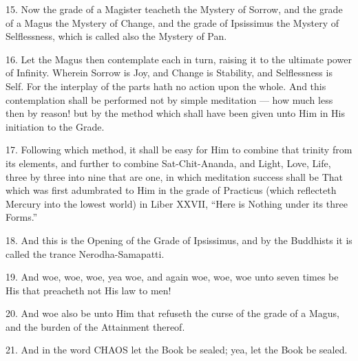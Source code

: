 15. Now the grade of a Magister teacheth the Mystery of Sorrow, and the grade of a Magus the Mystery of Change, and the grade of Ipsissimus the Mystery of Selflessness, which is called also the Mystery of Pan.

16. Let the Magus then contemplate each in turn, raising it to the ultimate power of Infinity. Wherein Sorrow is Joy, and Change is Stability, and Selflessness is Self. For the interplay of the parts hath no action upon the whole. And this contemplation shall be performed not by simple meditation --- how much less then by reason! but by the method which shall have been given unto Him in His initiation to the Grade.

17. Following which method, it shall be easy for Him to combine that trinity from its elements, and further to combine Sat-Chit-Ananda, and Light, Love, Life, three by three into nine that are one, in which meditation success shall be That which was first adumbrated to Him in the grade of Practicus (which reflecteth Mercury into the lowest world) in Liber XXVII, \enquote{Here is Nothing under its three Forms.}

18. And this is the Opening of the Grade of Ipsissimus, and by the Buddhists it is called the trance Nerodha-Samapatti.

19. And woe, woe, woe, yea woe, and again woe, woe, woe unto seven times be His that preacheth not His law to men!

20. And woe also be unto Him that refuseth the curse of the grade of a Magus, and the burden of the Attainment thereof.

21. And in the word CHAOS let the Book be sealed; yea, let the Book be sealed.
